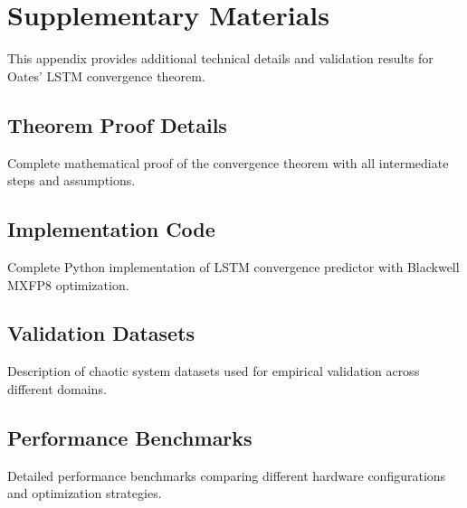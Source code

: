 \documentclass[11pt,a4paper]{article}
\begin{document}



\appendix

\section{Supplementary Materials}

This appendix provides additional technical details and validation results for Oates' LSTM convergence theorem.

\subsection{Theorem Proof Details}

Complete mathematical proof of the convergence theorem with all intermediate steps and assumptions.

\subsection{Implementation Code}

Complete Python implementation of LSTM convergence predictor with Blackwell MXFP8 optimization.

\subsection{Validation Datasets}

Description of chaotic system datasets used for empirical validation across different domains.

\subsection{Performance Benchmarks}

Detailed performance benchmarks comparing different hardware configurations and optimization strategies.
\end{document}
